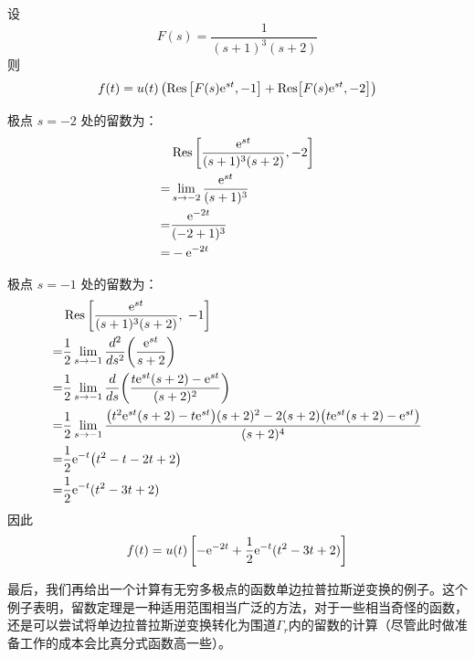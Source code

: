 \begin{example}
    设
    $$F(s) = \dfrac{1}{(s+1)^3(s+2)}$$
    则
    \[
    f(t) = u(t)\left(\operatorname{Res}\left[F(s)\mathrm{e}^{st}, -1\right] + \operatorname{Res}\!\left[F(s)\mathrm{e}^{st}, -2\right]\right)
    \]

    极点 $s=-2$ 处的留数为：
    \begin{align*}
    &\operatorname{Res}\left[\frac{\mathrm{e}^{st}}{(s+1)^3(s+2)}, -2\right] \\
    = &\lim_{s\to -2}\frac{\mathrm{e}^{st}}{(s+1)^3} \\
    = &\frac{\mathrm{e}^{-2t}}{(-2+1)^3} \\
    =& -\mathrm{e}^{-2t}
    \end{align*}

    极点 $s=-1$ 处的留数为：
    \begin{align*}
    &\operatorname{Res}\left[\frac{\mathrm{e}^{st}}{(s+1)^3(s+2)},\; -1\right]\\
    =& \frac{1}{2} \lim_{s\to -1} \frac{d^2}{ds^2}\!\left(\frac{\mathrm{e}^{st}}{s+2}\right) \\
    =& \frac{1}{2} \lim_{s\to -1} \frac{d}{ds}\!\left( \frac{t \mathrm{e}^{st}(s+2) - \mathrm{e}^{st}}{(s+2)^2} \right) \\
    =& \frac{1}{2} \lim_{s\to -1} \frac{ \bigl(t^2 \mathrm{e}^{st}(s+2) - t \mathrm{e}^{st}\bigr)(s+2)^2 - 2(s+2)\bigl(t \mathrm{e}^{st}(s+2) - \mathrm{e}^{st}\bigr) }{(s+2)^4} \\
    =& \frac{1}{2} \mathrm{e}^{-t} \bigl( t^2 - t - 2t + 2 \bigr) \\
    =& \frac{1}{2} \mathrm{e}^{-t} (t^2 - 3t + 2)
    \end{align*}
    因此
    \[
    f(t) =u(t)\left[ -\mathrm{e}^{-2t} + \frac{1}{2} \mathrm{e}^{-t}(t^2 - 3t + 2)\right]
    \]
\end{example}

最后，我们再给出一个计算有无穷多极点的函数单边拉普拉斯逆变换的例子\cite{folland}。这个例子表明，留数定理是一种适用范围相当广泛的方法，对于一些相当奇怪的函数，还是可以尝试将单边拉普拉斯逆变换转化为围道$\Gamma_r$内的留数的计算（尽管此时做准备工作的成本会比真分式函数高一些）。

